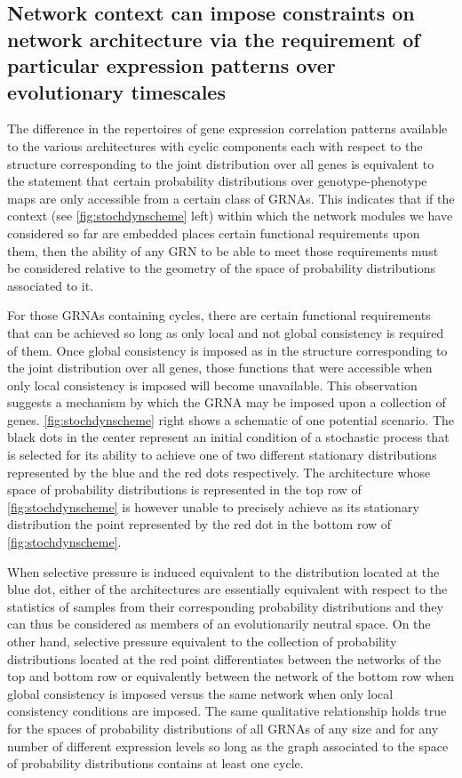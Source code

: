 \subsection{Network context can impose constraints on network architecture via the requirement of particular expression patterns over evolutionary timescales}

The difference in the repertoires of gene expression correlation patterns available to the various architectures with cyclic components each with respect to the structure corresponding to the joint distribution over all genes is equivalent to the statement that certain probability distributions over genotype-phenotype maps are only accessible from a certain class of GRNAs. This indicates that if the context (see \ref{fig:stochdynscheme} left) within which the network modules we have considered so far are embedded places certain functional requirements upon them, then the ability of any GRN to be able to meet those requirements must be considered relative to the geometry of the space of probability distributions associated to it.

For those GRNAs containing cycles, there are certain functional requirements that can be achieved so long as only local and not global consistency is required of them. Once global consistency is imposed as in the structure corresponding to the joint distribution over all genes, those functions that were accessible when only local consistency is imposed will become unavailable. This observation suggests a mechanism by which the GRNA may be imposed upon a collection of genes. \ref{fig:stochdynscheme} right shows a schematic of one potential scenario. The black dots in the center represent an initial condition of a stochastic process that is selected for its ability to achieve one of two different stationary distributions represented by the blue and the red dots respectively. The architecture whose space of probability distributions is represented in the top row of \ref{fig:stochdynscheme} is however unable to precisely achieve as its stationary distribution the point represented by the red dot in the bottom row of \ref{fig:stochdynscheme}.

When selective pressure is induced equivalent to the distribution located at the blue dot, either of the architectures are essentially equivalent with respect to the statistics of samples from their corresponding probability distributions and they can thus be considered as members of an evolutionarily neutral space. On the other hand, selective pressure equivalent to the collection of probability distributions located at the red point differentiates between the networks of the top and bottom row or equivalently between the network of the bottom row when global consistency is imposed versus the same network when only local consistency conditions are imposed. The same qualitative relationship holds true for the spaces of probability distributions of all GRNAs of any size and for any number of different expression levels so long as the graph associated to the space of probability distributions contains at least one cycle.
